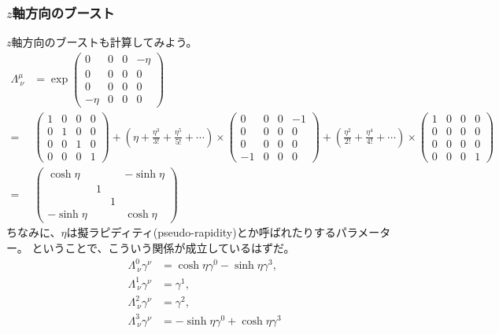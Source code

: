 \documentclass[10pt,a4paper]{jarticle}
\begin{document}
\subsubsection{$z$軸方向のブースト}
$z$軸方向のブーストも計算してみよう。
\begin{align}
\Lambda^{\mu}_{~\nu}
&=
\exp\left(\begin{array}{cccc}
0 & 0 & 0 & -\eta \\
0 & 0 & 0 & 0 \\
0 & 0 & 0 & 0 \\
-\eta & 0 & 0 & 0
\end{array}\right) \nonumber\\
%
=&
\left(\begin{array}{cccc}
1 & 0 & 0 & 0 \\
0 & 1 & 0 & 0 \\
0 & 0 & 1 & 0 \\
0 & 0 & 0 & 1
\end{array}
\right)
+
\left( \eta + \frac{\eta^3}{3!} + \frac{\eta^5}{5!} + \cdots \right) \times
\left(
\begin{array}{cccc}
0 & 0 & 0 & -1 \\
0 & 0 & 0 & 0 \\
0 & 0 & 0 & 0 \\
-1 & 0 & 0 & 0
\end{array}
\right)
+
\left( \frac{\eta^2}{2!} + \frac{\eta^4}{4!} + \cdots \right) \times
\left(\begin{array}{cccc}
1 & 0 & 0 & 0 \\
0 & 0 & 0 & 0 \\
0 & 0 & 0 & 0 \\
0 & 0 & 0 & 1
\end{array}
\right)
\nonumber\\
%
=&
\left(\begin{array}{cccc}
\cosh\eta &&& -\sinh\eta \\
& 1 &&\\
& & 1 &\\
-\sinh\eta &&& \cosh\eta
\end{array}\right)
\end{align}
ちなみに、$\eta$は擬ラピディティ(pseudo-rapidity)とか呼ばれたりするパラメーター。
ということで、こういう関係が成立しているはずだ。
\begin{align}
\Lambda^0_{~\nu} \gamma^\nu &= \cosh\eta \gamma^0 - \sinh\eta \gamma^3, \label{eq:boost gamma 0} \\
\Lambda^1_{~\nu} \gamma^\nu &= \gamma^1, \label{eq:boost gamma 1}\\
\Lambda^2_{~\nu} \gamma^\nu &= \gamma^2, \label{eq:boost gamma 2}\\
\Lambda^3_{~\nu} \gamma^\nu &= -\sinh\eta \gamma^0 + \cosh\eta \gamma^3 \label{eq:boost gamma 3}
\end{align}
\end{document}
